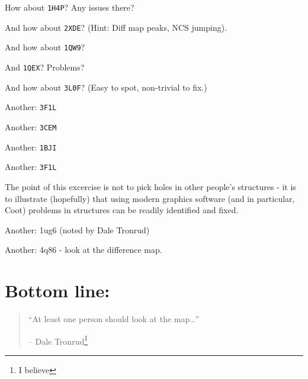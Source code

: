 \documentclass{article}
\begin{document}
How about \texttt{1H4P}?  Any issues there?

And how about \texttt{2XDE}? %
(Hint: Diff map peaks, NCS jumping).

And how about \texttt{1QW9}?

And \texttt{1QEX}?  Problems?

And how about \texttt{3L0F}? (Easy to spot, non-trivial to
fix.) %

Another: \texttt{3F1L}

Another: \texttt{3CEM}


Another: \texttt{1BJI}



Another: \texttt{3F1L}


The point of this excercise is not to pick holes in other people's
structures - it is to illustrate (hopefully) that using modern
graphics software (and in particular, Coot) problems in structures can
be readily identified and fixed.  


Another: 1ug6 (noted by Dale Tronrud)

Another: 4q86 - look at the difference map.  

%   


\section*{Bottom line:}

\begin{quotation}
  ``At least one person should look at the map\ldots'' 

  -- Dale Tronrud\footnote{I believe}
\end{quotation}
\end{document}
